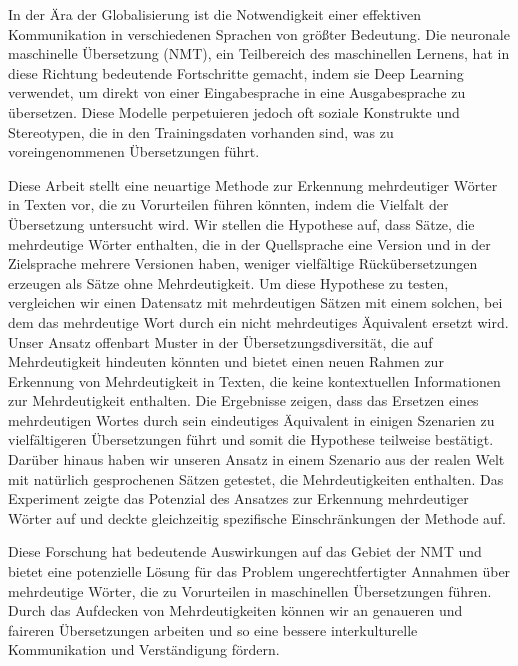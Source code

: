 \Abstract

In der Ära der Globalisierung ist die Notwendigkeit einer effektiven Kommunikation in verschiedenen Sprachen von größter Bedeutung. Die neuronale maschinelle Übersetzung (NMT), ein Teilbereich des maschinellen Lernens, hat in diese Richtung bedeutende Fortschritte gemacht, indem sie Deep Learning verwendet, um direkt von einer Eingabesprache in eine Ausgabesprache zu übersetzen. Diese Modelle perpetuieren jedoch oft soziale Konstrukte und Stereotypen, die in den Trainingsdaten vorhanden sind, was zu voreingenommenen Übersetzungen führt.

Diese Arbeit stellt eine neuartige Methode zur Erkennung mehrdeutiger Wörter in Texten vor, die zu Vorurteilen führen könnten, indem die Vielfalt der Übersetzung untersucht wird. Wir stellen die Hypothese auf, dass Sätze, die mehrdeutige Wörter enthalten, die in der Quellsprache eine Version und in der Zielsprache mehrere Versionen haben, weniger vielfältige Rückübersetzungen erzeugen als Sätze ohne Mehrdeutigkeit. Um diese Hypothese zu testen, vergleichen wir einen Datensatz mit mehrdeutigen Sätzen mit einem solchen, bei dem das mehrdeutige Wort durch ein nicht mehrdeutiges Äquivalent ersetzt wird. Unser Ansatz offenbart Muster in der Übersetzungsdiversität, die auf Mehrdeutigkeit hindeuten könnten und bietet einen neuen Rahmen zur Erkennung von Mehrdeutigkeit in Texten, die keine kontextuellen Informationen zur Mehrdeutigkeit enthalten. Die Ergebnisse zeigen, dass das Ersetzen eines mehrdeutigen Wortes durch sein eindeutiges Äquivalent in einigen Szenarien zu vielfältigeren Übersetzungen führt und somit die Hypothese teilweise bestätigt. Darüber hinaus haben wir unseren Ansatz in einem Szenario aus der realen Welt mit natürlich gesprochenen Sätzen getestet, die Mehrdeutigkeiten enthalten. Das Experiment zeigte das Potenzial des Ansatzes zur Erkennung mehrdeutiger Wörter auf und deckte gleichzeitig spezifische Einschränkungen der Methode auf.

Diese Forschung hat bedeutende Auswirkungen auf das Gebiet der NMT und bietet eine potenzielle Lösung für das Problem ungerechtfertigter Annahmen über mehrdeutige Wörter, die zu Vorurteilen in maschinellen Übersetzungen führen. Durch das Aufdecken von Mehrdeutigkeiten können wir an genaueren und faireren Übersetzungen arbeiten und so eine bessere interkulturelle Kommunikation und Verständigung fördern.
